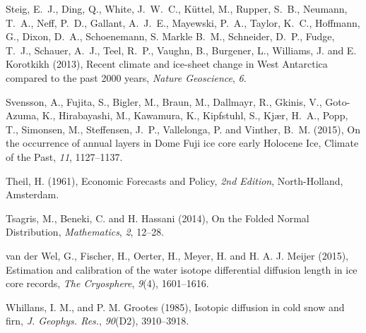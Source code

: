 \documentclass[draft, jgrga]{AGUTeX}
\begin{document}
\begin{article}
\begin{thebibliography}{}
Steig, E.~J., Ding, Q., White, J.~W.~C., Küttel, M., Rupper, S.~B., Neumann, T.~A., Neff, P.~D., Gallant, A.~J.~E., Mayewski, P.~A.,
Taylor, K.~C., Hoffmann, G., Dixon, D.~A., Schoenemann, S. Markle B.~M., Schneider, D.~P., Fudge, T.~J.,
Schauer, A.~J., Teel, R.~P., Vaughn, B., Burgener, L., Williams, J. and E. Korotkikh (2013),
{Recent climate and ice-sheet change in West Antarctica compared to the past 2000 years},
\textit{Nature Geoscience}, \textit{6}.

Svensson, A., Fujita, S., Bigler, M., Braun, M., Dallmayr, R., Gkinis, V.,
Goto-Azuma, K., Hirabayashi, M., Kawamura, K., Kipfstuhl, S., Kjær, H.~A.,
Popp, T., Simonsen, M., Steffensen, J.~P., Vallelonga, P. and Vinther, B.~M. (2015),
{On the occurrence of annual layers in Dome Fuji ice core early Holocene Ice},
{Climate of	the Past}, \textit{11}, 1127--1137.

Theil, H. (1961),
{Economic Forecasts and Policy},
\textit{2nd Edition}, North-Holland, Amsterdam.

Tsagris, M., Beneki, C. and H. Hassani (2014),
{On the Folded Normal Distribution},
\textit{Mathematics}, \textit{2}, 12--28.

van der Wel, G., Fischer, H., Oerter, H., Meyer, H. and H. A. J. Meijer (2015),
Estimation and calibration of the water isotope differential diffusion length in ice core records,
\textit{The Cryosphere}, \textit{9}(4), 1601--1616.

Whillans, I. M., and P. M. Grootes (1985),
Isotopic diffusion in cold snow and firn,
\textit{J. Geophys. Res.}, \textit{90}(D2), 3910--3918.







\end{thebibliography}



\end{article}
\end{document}
